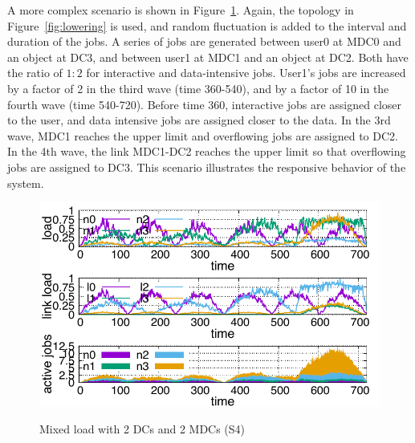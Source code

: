 A more complex scenario is shown in Figure~\ref{fig:mixed}.
Again, the topology in Figure~\ref{fig:lowering} is used, and
random fluctuation is added to the interval and duration of the jobs.
A series of jobs are generated
between user0 at MDC0 and an object at DC3, and
between user1 at MDC1 and an object at DC2.
Both have the ratio of $1:2$ for interactive and data-intensive jobs.
User1's jobs are increased by a factor of 2 in the third wave (time
360-540), and by a factor of 10 in the fourth wave (time 540-720). 
Before time 360, interactive jobs are assigned closer to the user,
and data intensive jobs are assigned closer to the data.
In the 3rd wave, MDC1 reaches the upper limit and overflowing jobs are
assigned to DC2.
In the 4th wave, the link MDC1-DC2 reaches the upper limit so that
overflowing jobs are assigned to DC3.
This scenario illustrates the responsive behavior of the system.

\begin{figure}[tb]
  \begin{center}
    \includegraphics[width=1.0\columnwidth]{simu2.pdf}
    \vspace{-2.0ex}
    \caption{Mixed load with 2 DCs and 2 MDCs (S4)}
    \label{fig:mixed}
  \end{center}
\end{figure}


